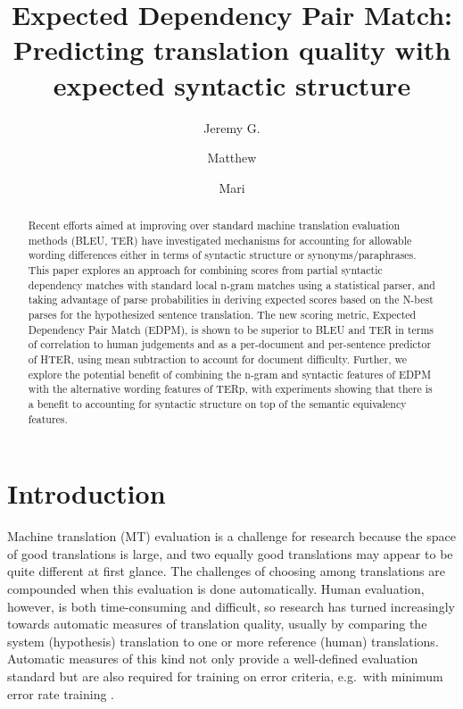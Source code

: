 \documentclass{kluwer}    %
\begin{document}
\begin{article}
\begin{opening}         
\title{Expected Dependency Pair Match:\\
Predicting translation quality with expected syntactic structure} 
\author{Jeremy G. }  
\author{Matthew }
\author{Mari }  

\begin{abstract}
  Recent efforts aimed at improving over standard machine translation
  evaluation methods (BLEU, TER) have investigated mechanisms for
  accounting for allowable wording differences either in terms of
  syntactic structure or synonyms/paraphrases. This paper explores an
  approach for combining scores from partial syntactic dependency
  matches with standard local n-gram matches using a statistical
  parser, and taking advantage of parse probabilities in deriving
  expected scores based on the N-best parses for the hypothesized
  sentence translation.  The new scoring metric, Expected Dependency
  Pair Match (EDPM), is shown to be superior to BLEU and TER in terms
  of correlation to human judgements and as a per-document and
  per-sentence predictor of HTER, using mean subtraction to account
  for document difficulty. Further, we explore the potential benefit
  of combining the n-gram and syntactic features of EDPM with the
  alternative wording features of TERp, with experiments showing that
  there is a benefit to accounting for syntactic structure on top of
  the semantic equivalency features.
\end{abstract}

\end{opening}           

\section{Introduction}
\label{sec:intro}

Machine translation (MT) evaluation is a challenge for research
because the space of good translations is large, and two equally good
translations may appear to be quite different at first glance. 
%
The challenges of choosing among translations are compounded when this
evaluation is done automatically.
%
Human evaluation, however, is both time-consuming and difficult, so
research has turned increasingly towards automatic measures of
translation quality, usually by comparing the system (hypothesis) translation to
one or more reference (human) translations.
%
Automatic measures of this kind not
only provide a well-defined evaluation standard but are also required
for training on error criteria, e.g.\ with minimum error rate training
\cite{och03mert}.


\end{article}
\end{document}
